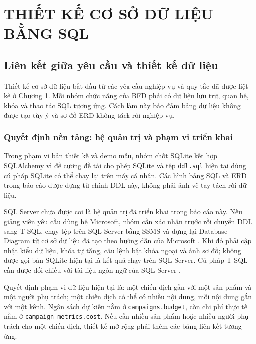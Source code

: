 \chapter{THIẾT KẾ CƠ SỞ DỮ LIỆU BẰNG SQL}

\section{Liên kết giữa yêu cầu và thiết kế dữ liệu}

Thiết kế cơ sở dữ liệu bắt đầu từ các yêu cầu nghiệp vụ và quy tắc đã được liệt kê ở Chương 1. Mỗi nhóm chức năng của BFD phải có dữ liệu lưu trữ, quan hệ, khóa và thao tác SQL tương ứng. Cách làm này bảo đảm bảng dữ liệu không được tạo tùy ý và sơ đồ ERD không tách rời nghiệp vụ.

\subsection*{Quyết định nền tảng: hệ quản trị và phạm vi triển khai}

Trong phạm vi bản thiết kế và demo mẫu, nhóm chốt SQLite kết hợp SQLAlchemy vì đề cương đề tài cho phép SQLite và tệp \texttt{ddl.sql} hiện tại dùng cú pháp SQLite có thể chạy lại trên máy cá nhân. Các hình bảng SQL và ERD trong báo cáo được dựng từ chính DDL này, không phải ảnh vẽ tay tách rời dữ liệu.

SQL Server chưa được coi là hệ quản trị đã triển khai trong báo cáo này. Nếu giảng viên yêu cầu dùng hệ Microsoft, nhóm cần xác nhận trước rồi chuyển DDL sang T-SQL, chạy tệp trên SQL Server bằng SSMS và dựng lại Database Diagram từ cơ sở dữ liệu đã tạo theo hướng dẫn của Microsoft \cite{msdiagrams}. Khi đó phải cập nhật kiểu dữ liệu, khóa tự tăng, câu lệnh bật khóa ngoại và ảnh sơ đồ; không được gọi bản SQLite hiện tại là kết quả chạy trên SQL Server. Cú pháp T-SQL cần được đối chiếu với tài liệu ngôn ngữ của SQL Server \cite{tsql}.

Quyết định phạm vi dữ liệu hiện tại là: một chiến dịch gắn với một sản phẩm và một người phụ trách; một chiến dịch có thể có nhiều nội dung, mỗi nội dung gắn với một kênh. Ngân sách dự kiến nằm ở \texttt{campaigns.budget}, còn chi phí thực tế nằm ở \texttt{campaign\_metrics.cost}. Nếu cần nhiều sản phẩm hoặc nhiều người phụ trách cho một chiến dịch, thiết kế mở rộng phải thêm các bảng liên kết tương ứng.

